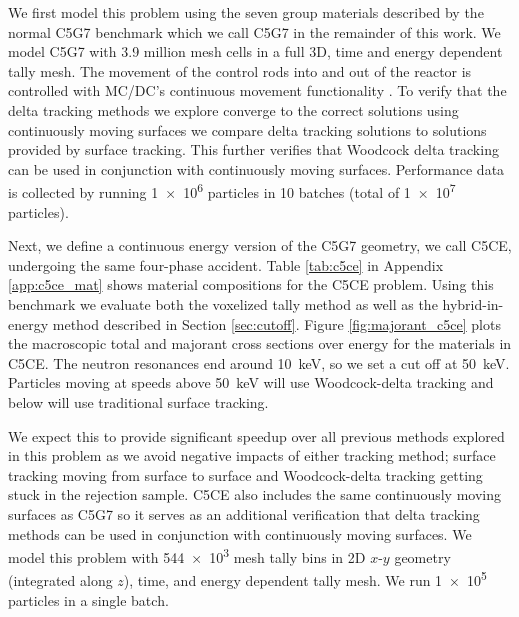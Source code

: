 We first model this problem using the seven group materials described by the normal C5G7 benchmark \cite{jia_hou_oecdnea_2017} which we call C5G7 in the remainder of this work.
We model C5G7 with \num{3.9} million mesh cells in a full 3D, time and energy dependent tally mesh.
The movement of the control rods into and out of the reactor is controlled with MC/DC's continuous movement functionality \cite{variansyah_2023_highfidelity}.
To verify that the delta tracking methods we explore converge to the correct solutions using continuously moving surfaces we compare delta tracking solutions to solutions provided by surface tracking.
This further verifies that Woodcock delta tracking can be used in conjunction with continuously moving surfaces.
Performance data is collected by running \num{1e6} particles in \num{10} batches (total of \num{1e7} particles).

Next, we define a continuous energy version of the C5G7 geometry, we call C5CE, undergoing the same four-phase accident.
Table \ref{tab:c5ce} in Appendix \ref{app:c5ce_mat} shows material compositions for the C5CE problem.
Using this benchmark we evaluate both the voxelized tally method as well as the hybrid-in-energy method described in Section \ref{sec:cutoff}.
Figure \ref{fig:majorant_c5ce} plots the macroscopic total and majorant cross sections over energy for the materials in C5CE.
The neutron resonances end around \SI{10}{\kilo\electronvolt}, so we set a cut off at \SI{50}{\kilo\electronvolt}.
Particles moving at speeds above \SI{50}{\kilo\electronvolt} will use Woodcock-delta tracking and below will use traditional surface tracking.

We expect this to provide significant speedup over all previous methods explored in this problem as we avoid negative impacts of either tracking method; surface tracking moving from surface to surface and Woodcock-delta tracking getting stuck in the rejection sample. 
C5CE also includes the same continuously moving surfaces as C5G7 so it serves as an additional verification that delta tracking methods can be used in conjunction with continuously moving surfaces.
We model this problem with \num{544e3} mesh tally bins in 2D $x$-$y$ geometry (integrated along $z$), time, and energy dependent tally mesh.
We run \num{1e5} particles in a single batch.

